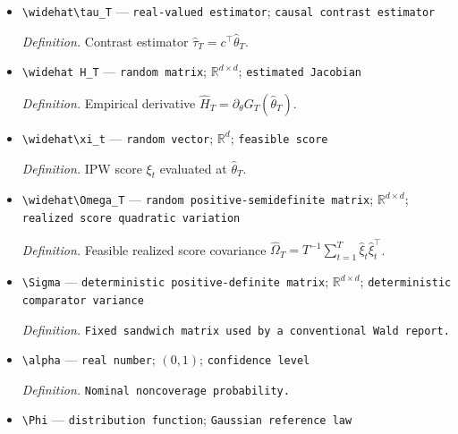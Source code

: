 \documentclass{article}
\begin{document}
\begin{itemize}
  \par\smallskip\noindent\emph{Definition.} Total measurable IPW-Z estimator obtained by selecting an exact empirical root from \(\mathcal Z_T\) on \(E_T\) and using \(\widetilde\theta_T\) on \(E_T^c\).
  \item \texttt{\textbackslash{}\allowbreak{}widehat\textbackslash{}\allowbreak{}tau\_\allowbreak{}T} --- \texttt{real-\allowbreak{}valued estimator}; \texttt{causal contrast estimator}
  \par\smallskip\noindent\emph{Definition.} Contrast estimator \(\widehat\tau_T=c^\top\widehat\theta_T\).
  \item \texttt{\textbackslash{}\allowbreak{}widehat H\_\allowbreak{}T} --- \texttt{random matrix}; \(\mathbb R^{d\times d}\); \texttt{estimated Jacobian}
  \par\smallskip\noindent\emph{Definition.} Empirical derivative \(\widehat H_T=\partial_\theta G_T(\widehat\theta_T)\).
  \item \texttt{\textbackslash{}\allowbreak{}widehat\textbackslash{}\allowbreak{}xi\_\allowbreak{}t} --- \texttt{random vector}; \(\mathbb R^d\); \texttt{feasible score}
  \par\smallskip\noindent\emph{Definition.} IPW score \(\xi_t\) evaluated at \(\widehat\theta_T\).
  \item \texttt{\textbackslash{}\allowbreak{}widehat\textbackslash{}\allowbreak{}Omega\_\allowbreak{}T} --- \texttt{random positive-\allowbreak{}semidefinite matrix}; \(\mathbb R^{d\times d}\); \texttt{realized score quadratic variation}
  \par\smallskip\noindent\emph{Definition.} Feasible realized score covariance \(\widehat\Omega_T=T^{-1}\sum_{t=1}^T\widehat\xi_t\widehat\xi_t^\top\).
  \item \texttt{\textbackslash{}\allowbreak{}Sigma} --- \texttt{deterministic positive-\allowbreak{}definite matrix}; \(\mathbb R^{d\times d}\); \texttt{deterministic comparator variance}
  \par\smallskip\noindent\emph{Definition.} \texttt{Fixed sandwich matrix used by a conventional Wald report.}
  \item \texttt{\textbackslash{}\allowbreak{}alpha} --- \texttt{real number}; \((0,1)\); \texttt{confidence level}
  \par\smallskip\noindent\emph{Definition.} \texttt{Nominal noncoverage probability.}
  \item \texttt{\textbackslash{}\allowbreak{}Phi} --- \texttt{distribution function}; \texttt{Gaussian reference law}

\end{itemize}
\end{document}
